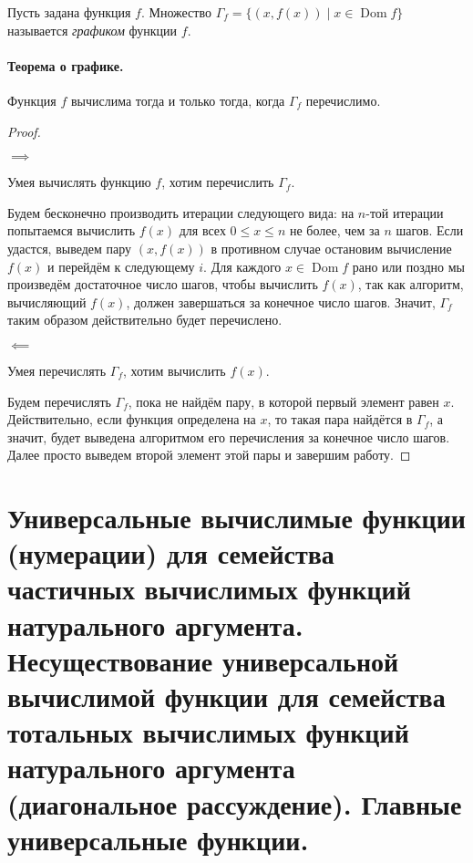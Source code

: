 \documentclass{article}
\begin{document}
    \begin{definition}
        Пусть задана функция $f$. Множество $\Gamma_f = \{(x, f(x)) \mid x \in \operatorname{Dom} f\}$
        называется \textit{графиком} функции $f$.
    \end{definition}

    \paragraph{Теорема о графике.} Функция $f$ вычислима тогда и только тогда, когда $\Gamma_f$
    перечислимо.
    \begin{proof}\

        $\implies$

        Умея вычислять функцию $f$, хотим перечислить $\Gamma_f$.

        Будем бесконечно производить итерации следующего вида: на $n$-той итерации попытаемся
        вычислить $f(x)$ для всех $0 \leqslant x \leqslant n$ не более, чем за $n$ шагов.
        Если удастся, выведем пару $(x, f(x))$ в противном случае остановим вычисление $f(x)$
        и перейдём к следующему $i$. Для каждого $x \in \operatorname{Dom} f$ рано или поздно мы
        произведём достаточное число шагов, чтобы вычислить $f(x)$, так как алгоритм, вычисляющий
        $f(x)$, должен завершаться за конечное число шагов. Значит, $\Gamma_f$ таким образом
        действительно будет перечислено.

        $\impliedby$

        Умея перечислять $\Gamma_f$, хотим вычислить $f(x)$.

        Будем перечислять $\Gamma_f$, пока не найдём пару, в которой первый элемент равен $x$.
        Действительно, если функция определена на $x$, то такая пара найдётся в $\Gamma_f$,
        а значит, будет выведена алгоритмом его перечисления за конечное число шагов. Далее просто
        выведем второй элемент этой пары и завершим работу.

    \end{proof}

    \section{Универсальные вычислимые функции (нумерации) для семейства частичных вычислимых
    функций натурального аргумента. Несуществование универсальной вычислимой функции для
    семейства тотальных вычислимых функций натурального аргумента (диагональное рассуждение).
    Главные универсальные функции.}
\end{document}
